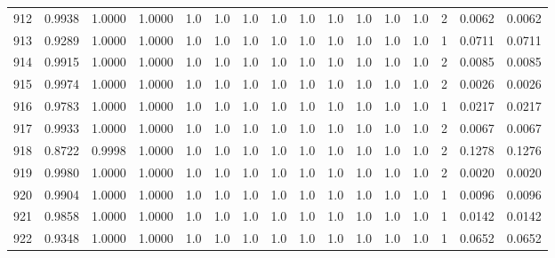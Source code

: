 \begin{tabular}{lrrrrrrrrrrrrrrr}
912 &      0.9938 &  1.0000 &  1.0000 &     1.0 &     1.0 &     1.0 &     1.0 &     1.0 &     1.0 &     1.0 &      1.0 &        1.0 &      2 &                    0.0062 &                     0.0062 \\
913 &      0.9289 &  1.0000 &  1.0000 &     1.0 &     1.0 &     1.0 &     1.0 &     1.0 &     1.0 &     1.0 &      1.0 &        1.0 &      1 &                    0.0711 &                     0.0711 \\
914 &      0.9915 &  1.0000 &  1.0000 &     1.0 &     1.0 &     1.0 &     1.0 &     1.0 &     1.0 &     1.0 &      1.0 &        1.0 &      2 &                    0.0085 &                     0.0085 \\
915 &      0.9974 &  1.0000 &  1.0000 &     1.0 &     1.0 &     1.0 &     1.0 &     1.0 &     1.0 &     1.0 &      1.0 &        1.0 &      2 &                    0.0026 &                     0.0026 \\
916 &      0.9783 &  1.0000 &  1.0000 &     1.0 &     1.0 &     1.0 &     1.0 &     1.0 &     1.0 &     1.0 &      1.0 &        1.0 &      1 &                    0.0217 &                     0.0217 \\
917 &      0.9933 &  1.0000 &  1.0000 &     1.0 &     1.0 &     1.0 &     1.0 &     1.0 &     1.0 &     1.0 &      1.0 &        1.0 &      2 &                    0.0067 &                     0.0067 \\
918 &      0.8722 &  0.9998 &  1.0000 &     1.0 &     1.0 &     1.0 &     1.0 &     1.0 &     1.0 &     1.0 &      1.0 &        1.0 &      2 &                    0.1278 &                     0.1276 \\
919 &      0.9980 &  1.0000 &  1.0000 &     1.0 &     1.0 &     1.0 &     1.0 &     1.0 &     1.0 &     1.0 &      1.0 &        1.0 &      2 &                    0.0020 &                     0.0020 \\
920 &      0.9904 &  1.0000 &  1.0000 &     1.0 &     1.0 &     1.0 &     1.0 &     1.0 &     1.0 &     1.0 &      1.0 &        1.0 &      1 &                    0.0096 &                     0.0096 \\
921 &      0.9858 &  1.0000 &  1.0000 &     1.0 &     1.0 &     1.0 &     1.0 &     1.0 &     1.0 &     1.0 &      1.0 &        1.0 &      1 &                    0.0142 &                     0.0142 \\
922 &      0.9348 &  1.0000 &  1.0000 &     1.0 &     1.0 &     1.0 &     1.0 &     1.0 &     1.0 &     1.0 &      1.0 &        1.0 &      1 &                    0.0652 &                     0.0652 \\

\end{tabular}
